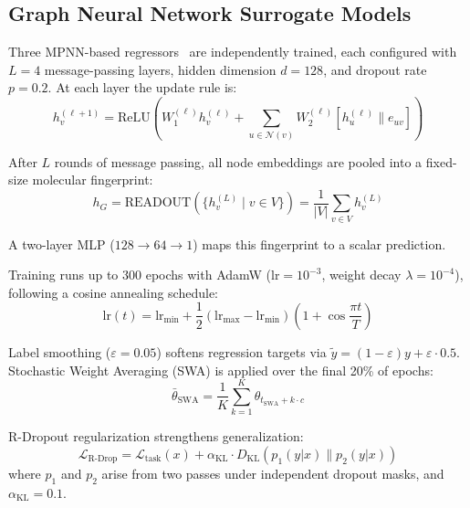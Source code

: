 \documentclass[twocolumn,10pt]{article}
\begin{document}
\subsection{Graph Neural Network Surrogate Models}

Three MPNN-based regressors~\cite{gilmer2017neural} are independently trained, each configured with $L=4$ message-passing layers, hidden dimension $d=128$, and dropout rate $p=0.2$. At each layer the update rule is:
\begin{equation}
h_v^{(\ell+1)} = \text{ReLU}\!\left(W_1^{(\ell)} h_v^{(\ell)} + \!\!\sum_{u \in \mathcal{N}(v)}\!\! W_2^{(\ell)} [h_u^{(\ell)} \| e_{uv}]\right)
\end{equation}

After $L$ rounds of message passing, all node embeddings are pooled into a fixed-size molecular fingerprint:
\begin{equation}
h_G = \text{READOUT}\left(\{h_v^{(L)} \mid v \in V\}\right) = \frac{1}{|V|} \sum_{v \in V} h_v^{(L)}
\label{eq:readout}
\end{equation}

A two-layer MLP ($128 \to 64 \to 1$) maps this fingerprint to a scalar prediction.

Training runs up to 300 epochs with AdamW (lr$=10^{-3}$, weight decay $\lambda = 10^{-4}$), following a cosine annealing schedule:
\begin{equation}
\text{lr}(t) = \text{lr}_\text{min} + \frac{1}{2}(\text{lr}_\text{max} - \text{lr}_\text{min})\left(1 + \cos\frac{\pi t}{T}\right)
\end{equation}

Label smoothing ($\varepsilon = 0.05$) softens regression targets via $\tilde{y} = (1 - \varepsilon)y + \varepsilon \cdot 0.5$. Stochastic Weight Averaging (SWA) is applied over the final 20\% of epochs:
\begin{equation}
\bar{\theta}_\text{SWA} = \frac{1}{K} \sum_{k=1}^{K} \theta_{t_\text{SWA} + k \cdot c}
\label{eq:swa}
\end{equation}

R-Dropout regularization strengthens generalization:
\begin{equation}
\mathcal{L}_\text{R-Drop} = \mathcal{L}_\text{task}(x) + \alpha_\text{KL} \cdot D_\text{KL}\left(p_1(y|x) \| p_2(y|x)\right)
\label{eq:rdrop}
\end{equation}
where $p_1$ and $p_2$ arise from two passes under independent dropout masks, and $\alpha_\text{KL} = 0.1$.
\end{document}
